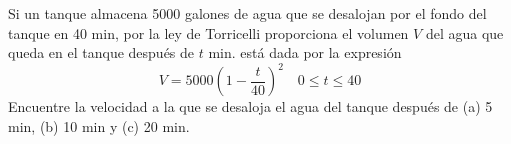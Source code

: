 \item Si un tanque almacena 5000 galones de agua que se desalojan por el fondo del tanque en 40 min, por la ley de Torricelli proporciona el volumen $V$ del agua que queda en el tanque después de $t$ min. está dada por la expresión
$$V = 5000\left(1 - \frac{t}{40}\right)^2 \quad 0 \le t \le 40$$
Encuentre la velocidad a la que se desaloja el agua del tanque después de (a) 5 min, (b) 10 min y (c) 20 min.
